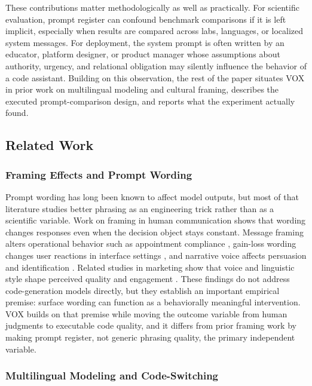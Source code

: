 \documentclass{article}
\begin{document}
These contributions matter methodologically as well as practically. For scientific evaluation, prompt register can confound benchmark comparisons if it is left implicit, especially when results are compared across labs, languages, or localized system messages. For deployment, the system prompt is often written by an educator, platform designer, or product manager whose assumptions about authority, urgency, and relational obligation may silently influence the behavior of a code assistant. Building on this observation, the rest of the paper situates VOX in prior work on multilingual modeling and cultural framing, describes the executed prompt-comparison design, and reports what the experiment actually found.

\subsection{Related Work}

\label{sec:related_work}

\subsubsection{Framing Effects and Prompt Wording}

\label{sec:framing_effects_and_prompt_wording}

Prompt wording has long been known to affect model outputs, but most of that literature studies better phrasing as an engineering trick rather than as a scientific variable. Work on framing in human communication shows that wording changes responses even when the decision object stays constant. Message framing alters operational behavior such as appointment compliance \cite{liu2023nudging}, gain-loss wording changes user reactions in interface settings \cite{tiffany2020gainloss}, and narrative voice affects persuasion and identification \cite{perosanz2020narrative}. Related studies in marketing show that voice and linguistic style shape perceived quality and engagement \cite{ananthakrishnan2023hear, munaro2024your}. These findings do not address code-generation models directly, but they establish an important empirical premise: surface wording can function as a behaviorally meaningful intervention. VOX builds on that premise while moving the outcome variable from human judgments to executable code quality, and it differs from prior framing work by making prompt register, not generic phrasing quality, the primary independent variable.

\subsubsection{Multilingual Modeling and Code-Switching}
\end{document}
